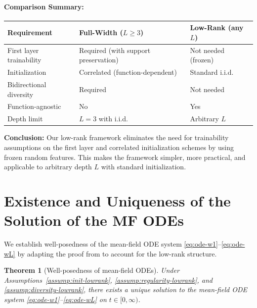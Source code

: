 \documentclass[11pt]{article}
\newcommand{\1}{\mathbbm{1}}
\newtheorem{theorem}{Theorem}
\begin{document}
\paragraph*{Comparison Summary:}

\begin{center}
\begin{tabular}{|l|l|l|}
\hline
\textbf{Requirement} & \textbf{Full-Width ($L \ge 3$)} & \textbf{Low-Rank (any $L$)} \\
\hline
First layer trainability & Required (with support preservation) & Not needed (frozen) \\
Initialization & Correlated (function-dependent) & Standard i.i.d. \\
Bidirectional diversity & Required & Not needed \\
Function-agnostic & No & Yes \\
Depth limit & $L = 3$ with i.i.d. & Arbitrary $L$ \\
\hline
\end{tabular}
\end{center}

\textbf{Conclusion:} Our low-rank framework eliminates the need for trainability assumptions on the first layer and correlated initialization schemes by using frozen random features. This makes the framework simpler, more practical, and applicable to arbitrary depth $L$ with standard initialization.

\section{Existence and Uniqueness of the Solution of the MF ODEs}
\label{sec:Existence-MF}

We establish well-posedness of the mean-field ODE system \eqref{eq:ode-w1}--\eqref{eq:ode-wL} by adapting the proof from \cite{nguyen2023rigorousframeworkmeanfield} to account for the low-rank structure.

\begin{theorem}[Well-posedness of mean-field ODEs]
\label{thm:wellposed}
Under Assumptions~\ref{assump:init-lowrank}, \ref{assump:regularity-lowrank}, and \ref{assump:diversity-lowrank}, there exists a unique solution to the mean-field ODE system \eqref{eq:ode-w1}--\eqref{eq:ode-wL} on $t\in[0,\infty)$.
\end{theorem}
\end{document}
